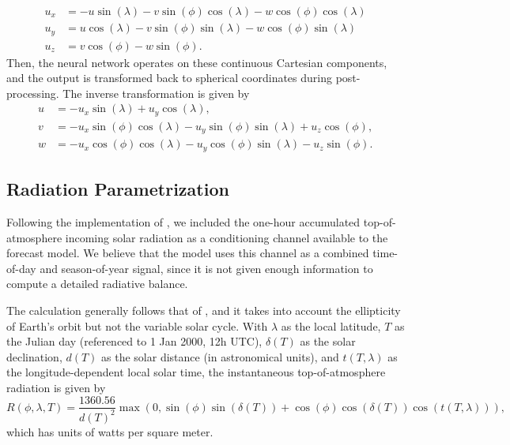 \documentclass[preprint]{article}
\begin{document}
\begin{appendices}
\begin{align*} 
    u_x &= -u\sin(\lambda) - v\sin(\phi)\cos(\lambda) - w\cos(\phi)\cos(\lambda) \\ 
    u_y &= u\cos(\lambda) - v\sin(\phi)\sin(\lambda) - w\cos(\phi)\sin(\lambda) \\ 
    u_z &= v\cos(\phi) - w\sin(\phi). 
\end{align*}
Then, the neural network operates on these continuous Cartesian components, and the output is transformed back to spherical coordinates during post-processing. The inverse transformation is given by
\begin{align*} 
    u &= -u_x\sin(\lambda) + u_y\cos(\lambda), \\ 
    v &= -u_x\sin(\phi)\cos(\lambda) - u_y\sin(\phi)\sin(\lambda) + u_z\cos(\phi), \\ 
    w &= -u_x\cos(\phi)\cos(\lambda) - u_y\cos(\phi)\sin(\lambda) - u_z\sin(\phi).
\end{align*}

\subsection{Radiation Parametrization}

Following the implementation of \cite{lam2023learning}, we included the one-hour accumulated top-of-atmosphere incoming solar radiation as a conditioning channel available to the forecast model.  We believe that the model uses this channel as a combined time-of-day and season-of-year signal, since it is not given enough information to compute a detailed radiative balance.

The calculation generally follows that of \cite{wald_basics_2019}, and it takes into account the ellipticity of Earth's orbit but not the variable solar cycle.  With $\lambda$ as the local latitude, $T$ as the Julian day (referenced to 1 Jan 2000, 12h UTC), $\delta(T)$ as the solar declination, $d(T)$ as the solar distance (in astronomical units), and $t(T,\lambda)$ as the longitude-dependent local solar time, the instantaneous top-of-atmosphere radiation is given by
\begin{equation} \label{eqn:toa_rad_local}
R(\phi,\lambda,T) = \frac{1360.56}{d(T)^2} \max(0,\sin(\phi)\sin(\delta(T)) + \cos(\phi)\cos(\delta(T))\cos(t(T,\lambda))),
\end{equation}
which has units of watts per square meter.


\end{appendices}
\end{document}
